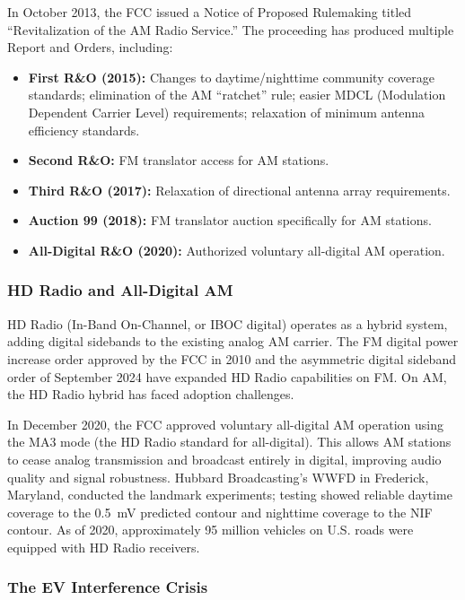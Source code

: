 \documentclass[11pt,letterpaper]{article}
\begin{document}
\begin{asciibox}
In October 2013, the FCC issued a Notice of Proposed Rulemaking titled ``Revitalization of the
AM Radio Service.'' The proceeding has produced multiple Report and Orders, including:
\begin{itemize}[leftmargin=*]
  \item \textbf{First R\&O (2015):} Changes to daytime/nighttime community coverage standards;
        elimination of the AM ``ratchet'' rule; easier MDCL (Modulation Dependent Carrier Level)
        requirements; relaxation of minimum antenna efficiency standards.
  \item \textbf{Second R\&O:} FM translator access for AM stations.
  \item \textbf{Third R\&O (2017):} Relaxation of directional antenna array requirements.
  \item \textbf{Auction 99 (2018):} FM translator auction specifically for AM stations.
  \item \textbf{All-Digital R\&O (2020):} Authorized voluntary all-digital AM operation.
\end{itemize}

\subsubsection{HD Radio and All-Digital AM}

HD Radio (In-Band On-Channel, or IBOC digital) operates as a hybrid system, adding digital
sidebands to the existing analog AM carrier. The FM digital power increase order approved
by the FCC in 2010 and the asymmetric digital sideband order of September 2024 have expanded
HD Radio capabilities on FM. On AM, the HD Radio hybrid has faced adoption challenges.

In December 2020, the FCC approved voluntary all-digital AM operation using the MA3 mode
(the HD Radio standard for all-digital). This allows AM stations to cease analog transmission
and broadcast entirely in digital, improving audio quality and signal robustness. Hubbard
Broadcasting's WWFD in Frederick, Maryland, conducted the landmark experiments; testing showed
reliable daytime coverage to the 0.5~mV predicted contour and nighttime coverage to the NIF
contour. As of 2020, approximately 95 million vehicles on U.S. roads were equipped with HD
Radio receivers.

\subsubsection{The EV Interference Crisis}


\end{asciibox}
\end{document}
